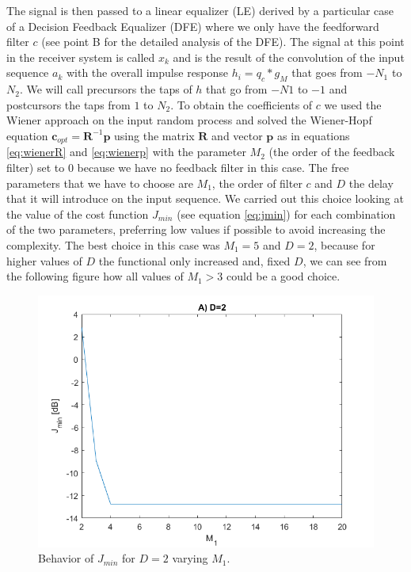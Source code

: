 \documentclass[a4paper,11.5pt]{article}
\newcommand{\vt}{\boldsymbol}
\begin{document}
The signal is then passed to a linear equalizer (LE) derived by a particular case of a Decision Feedback Equalizer (DFE) where we only have the feedforward filter $c$ (see point B for the detailed analysis of the DFE). The signal at this point in the receiver system is called $x_k$ and is the result of the convolution of the input sequence $a_k$ with the overall impulse response $h_i = q_c * g_M$ that goes from $-N_1$ to $N_2$. We will call precursors the taps of $h$ that go from $-N1$ to $-1$ and postcursors the taps from $1$ to $N_2$. To obtain the coefficients of $c$ we used the Wiener approach on the input random process and solved the Wiener-Hopf equation $\vt{c}_{opt}=\vt{R}^{-1}\vt{p}$ using the matrix $\vt{R}$ and vector $\vt{p}$ as in equations \ref{eq:wienerR} and \ref{eq:wienerp} with the parameter $M_2$ (the order of the feedback filter) set to $0$ because we have no feedback filter in this case. The free parameters that we have to choose are $M_1$, the order of filter $c$ and $D$ the delay that it will introduce on the input sequence. We carried out this choice looking at the value of the cost function $J_{min}$ (see equation \ref{eq:jmin}) for each combination of the two parameters, preferring low values if possible to avoid increasing the complexity. The best choice in this case was $M_1=5$ and $D=2$, because for higher values of $D$ the functional only increased and, fixed $D$, we can see from the following figure how all values of $M_1>3$ could be a good choice.

\begin{figure}[H]
	\begin{center}   
		\includegraphics[width=\textwidth]{figs/A_Jmin.png} 
		\caption{Behavior of $J_{min}$ for $D=2$ varying $M_1$.}
		\label{fig:A_Jmin}
	\end{center}
\end{figure}
\end{document}
